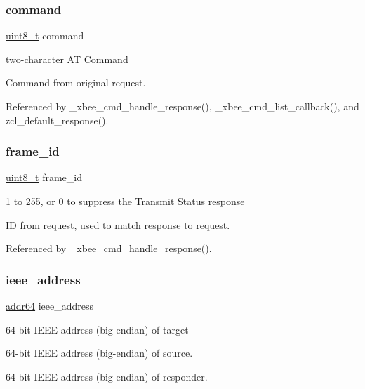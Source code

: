 \subsubsection{\texorpdfstring{command}{command}}
{\footnotesize\ttfamily \hyperlink{group__hal__dos_gae1affc9ca37cfb624959c866a73f83c2}{uint8\+\_\+t} command}



two-\/character AT Command 

Command from original request. 

Referenced by \+\_\+xbee\+\_\+cmd\+\_\+handle\+\_\+response(), \+\_\+xbee\+\_\+cmd\+\_\+list\+\_\+callback(), and zcl\+\_\+default\+\_\+response().

\mbox{\label{group__xbee__atcmd_ga03c1016ac46b9df250b994f242cf956a}} 
\subsubsection{\texorpdfstring{frame\+\_\+id}{frame\_id}}
{\footnotesize\ttfamily \hyperlink{group__hal__dos_gae1affc9ca37cfb624959c866a73f83c2}{uint8\+\_\+t} frame\+\_\+id}



1 to 255, or 0 to suppress the Transmit Status response 

ID from request, used to match response to request. 

Referenced by \+\_\+xbee\+\_\+cmd\+\_\+handle\+\_\+response().

\mbox{\label{group__xbee__atcmd_ga2549f921e25a72dfa05a2154a792e2bf}} 
\subsubsection{\texorpdfstring{ieee\+\_\+address}{ieee\_address}}
{\footnotesize\ttfamily \hyperlink{unionaddr64}{addr64} ieee\+\_\+address}



64-\/bit I\+E\+EE address (big-\/endian) of target 

64-\/bit I\+E\+EE address (big-\/endian) of source.

64-\/bit I\+E\+EE address (big-\/endian) of responder. \mbox{\label{group__xbee__atcmd_ga73d48563eb05cd5fcc4add79d226a3b8}} 
